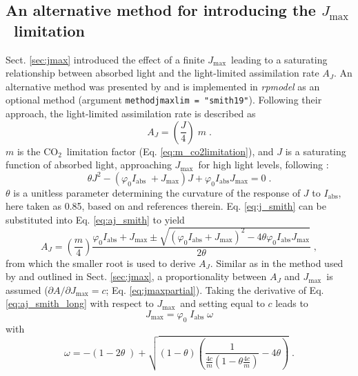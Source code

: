 \documentclass[gmd, manuscript]{copernicus}
\newcommand{\coo}{CO$_2$}
\newcommand{\jmax}{$J_{\text{max}}$}
\begin{document}
\subsection{An alternative method for introducing the \jmax\ limitation}
\label{sec:jmaxlim_smith}
Sect. \ref{sec:jmax} introduced the effect of a finite \jmax\, leading to a saturating relationship between absorbed light and the light-limited assimilation rate $A_J$. An alternative method was presented by \citet{smith19ecollett} and is implemented in \textit{rpmodel} as an optional method (argument \texttt{method\textunderscore jmaxlim = "smith19"}). Following their approach, the light-limited assimilation rate is described as
\begin{equation}
\label{eq:aj_smith}
    A_J = \left(\frac{J}{4} \right) \; m \;.
\end{equation}
$m$ is the \coo\ limitation factor (Eq. \ref{eq:m_co2limitation}), and $J$ is a saturating function of absorbed light, approaching \jmax\ for high light levels, following \citet{farquhar80}:
\begin{equation}
\label{eq:j_smith}
   \theta  J^2 - 
    \left(
    \varphi_0  I_{\mathrm{abs}} \; + J_{\mathrm{max}}
    \right)  J +
     \varphi_0 I_{\mathrm{abs}}  J_{\mathrm{max}} = 0 \;.  
\end{equation}
$\theta$ is a unitless parameter determining the curvature of the response of $J$ to $I_{\mathrm{abs}}$, here taken as 0.85, based on \citet{smith19ecollett} and references therein. Eq. \ref{eq:j_smith} can be substituted into Eq. \ref{eq:aj_smith} to yield
\begin{equation}
\label{eq:aj_smith_long}
    A_J = \left( \frac{m}{4} \right)
    \frac{\varphi_0 I_{\mathrm{abs}} + J_{\mathrm{max}} \pm 
    \sqrt{
    \left(\varphi_0 I_{\mathrm{abs}} + J_{\mathrm{max}} \right)^2 -
    4  \theta \varphi_0 I_{\mathrm{abs}} J_{\mathrm{max}}}}
    {2 \theta} \;,
\end{equation}
from which the smaller root is used to derive $A_J$. Similar as in the method used by \citet{wang17natpl} and outlined in Sect. \ref{sec:jmax}, a proportionality between $A_J$ and \jmax\ is assumed ($\partial A / \partial J_{\mathrm{max}} = c$; Eq. \ref{eq:jmaxpartial}). Taking the derivative of Eq. \ref{eq:aj_smith_long} with respect to \jmax\ and setting equal to $c$ leads to 
\begin{equation}
    J_{\mathrm{max}} = \varphi_0 \; I_{\mathrm{abs}} \; \omega
\end{equation}
with
\begin{equation}
    \omega = - \left(1 - 2 \theta \; \right) +
    \sqrt{\left(1 - \theta \right)
    \left(
    \frac{1}{
    \frac{4  c}{m}
    \left(1 - \theta 
    \frac{4  c}{m}\right)
    } - 4  \theta \right) }\;.
\end{equation}
\end{document}
